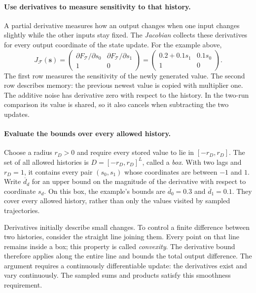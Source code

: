 \paragraph{Use derivatives to measure sensitivity to that history.}
A partial derivative measures how an output changes when one input changes
slightly while the other inputs stay fixed. The \emph{Jacobian} collects
these derivatives for every output coordinate of the state update.
For the example above,
\begin{equation}
 J_{\mathcal F}(\mathbf{s})=
 \begin{pmatrix}
  \partial F_{\mathcal T}/\partial s_0 &
  \partial F_{\mathcal T}/\partial s_1\\
  1 & 0
 \end{pmatrix}
 =\begin{pmatrix}
   0.2+0.1s_1 & 0.1s_0\\
   1 & 0
  \end{pmatrix}.
 \label{eq:jacobian-explanatory-matrix}
\end{equation}
The first row measures the sensitivity of the newly generated value.
The second row describes memory: the previous newest value is copied with
multiplier one. The additive noise has derivative zero with respect to the
history. In the two-run comparison its value is shared, so it also cancels
when subtracting the two updates.

\paragraph{Evaluate the bounds over every allowed history.}
Choose a radius $r_D>0$ and require every stored value to lie in
$[-r_D,r_D]$. The set of all allowed histories is
$D=[-r_D,r_D]^L$, called a \emph{box}. With two lags and $r_D=1$, it contains
every pair $(s_0,s_1)$ whose coordinates are between $-1$ and $1$.
Write $\overline d_d$ for an upper bound on the magnitude of the derivative
with respect to coordinate $s_d$. On this box, the example's bounds are
$\overline d_0=0.3$ and $\overline d_1=0.1$.
They cover every allowed history, rather than only the values visited by
sampled trajectories.

Derivatives initially describe small changes. To control a finite difference
between two histories, consider the straight line joining them. Every point
on that line remains inside a box; this property is called \emph{convexity}.
The derivative bound therefore applies along the entire line and bounds the
total output difference. The argument requires a continuously differentiable
update: the derivatives exist and vary continuously. The sampled sums and
products satisfy this smoothness requirement.

